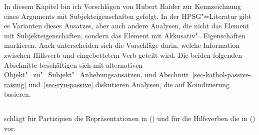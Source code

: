 {In diesem Kapitel bin ich Vorschlägen von Hubert Haider zur Kennzeichnung eines Arguments 
mit Subjekteigenschaften gefolgt. In der HPSG"=Literatur gibt es Varianten dieses Ansatzes,
aber auch andere Analysen, die nicht das Element mit Subjekteigenschaften, sondern
das Element mit Akkusativ"=Eigenschaften markieren. Auch unterscheiden sich die Vorschläge
darin, welche Information zwischen Hilfsverb und eingebettetem Verb geteilt wird.
Die beiden folgenden Abschnitte beschäftigen sich mit alternativen Objekt"=zu"=Subjekt"=Anhebungsansätzen,
und Abschnitt~\ref{sec-kathol-passive-raising} und~\ref{sec-ryu-passive} diskutieren
Analysen, die auf Koindizierung basieren.



\subsection{}
\label{sec-kathol-passive}

\mbox{}\citet[Abschnitt~7.3.3]{Kathol94a} schlägt für Partizipien die Repräsentationen in
() und für die Hilfsverben die in () vor.

}
